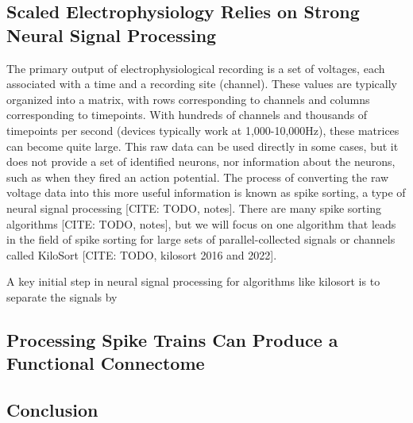 \documentclass[11pt]{article}
\newcommand{\subsectionwithindent}[1]{
    \subsection*{#1}
    \hspace{\parindent} %
}
\begin{document}
\subsectionwithindent{Scaled Electrophysiology Relies on Strong Neural Signal Processing}
The primary output of electrophysiological recording is a set of voltages, each associated with a time and a recording site (channel). These values are typically organized into a matrix, with rows corresponding to channels and columns corresponding to timepoints. With hundreds of channels and thousands of timepoints per second (devices typically work at 1,000-10,000Hz), these matrices can become quite large. This raw data can be used directly in some cases, but it does not provide a set of identified neurons, nor information about the neurons, such as when they fired an action potential. The process of converting the raw voltage data into this more useful information is known as spike sorting, a type of neural signal processing [CITE: TODO, notes]. There are many spike sorting algorithms [CITE: TODO, notes], but we will focus on one algorithm that leads in the field of spike sorting for large sets of parallel-collected signals or channels called KiloSort [CITE: TODO, kilosort 2016 and 2022].

A key initial step in neural signal processing for algorithms like kilosort is to separate the signals by





\subsectionwithindent{Processing Spike Trains Can Produce a Functional Connectome}


\subsectionwithindent{Conclusion}

\newpage
\printbibliography
\end{document}
